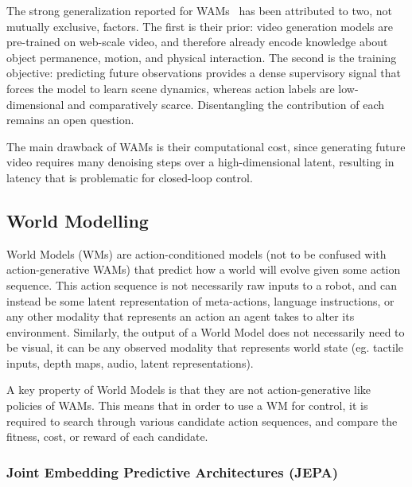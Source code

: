 The strong generalization reported for WAMs~\citep{ye2026world} has been attributed to two, not mutually exclusive, factors. The first is their prior: video generation models are pre-trained on web-scale video, and therefore already encode knowledge about object permanence, motion, and physical interaction. The second is the training objective: predicting future observations provides a dense supervisory signal that forces the model to learn scene dynamics, whereas action labels are low-dimensional and comparatively scarce. Disentangling the contribution of each remains an open question.\cite{zhu2025unified}

The main drawback of WAMs is their computational cost, since generating future video requires many denoising steps over a high-dimensional latent, resulting in latency that is problematic for closed-loop control. %

\subsection{World Modelling}
\label{sec:worldmodels}
World Models (WMs) are action-conditioned models (not to be confused with action-generative WAMs) that predict how a world will evolve given some action sequence. This action sequence is not necessarily raw inputs to a robot, and can instead be some latent representation of meta-actions, language instructions, or any other modality that represents an action an agent takes to alter its environment. Similarly, the output of a World Model does not necessarily need to be visual, it can be any observed modality that represents world state (eg. tactile inputs, depth maps, audio, latent representations). 

A key property of World Models is that they are not action-generative like policies of WAMs. This means that in order to use a WM for control, it is required to search through various candidate action sequences, and compare the fitness, cost, or reward of each candidate. 

\subsubsection{Joint Embedding Predictive Architectures (JEPA)}
\label{sec:jepa}

